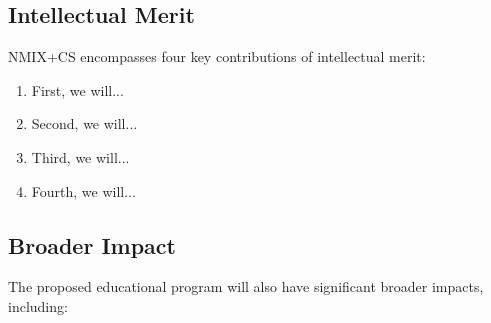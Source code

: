 \subsection{Intellectual Merit} 
NMIX+CS encompasses four key contributions of intellectual merit:
\begin{enumerate}
\item First, we will...
\item Second, we will...
\item Third, we will...
\item Fourth, we will...
\end{enumerate}

\subsection{Broader Impact} 
The proposed educational program will also have significant broader impacts, including:
